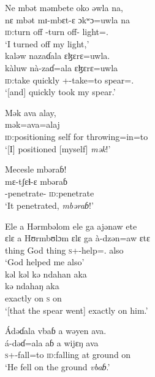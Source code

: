 \ea
 Ne  mbət  məmbete  oko  əwla  na,\\
\gll nɛ   mbət           mɪ-mbɛt-ɛ           ɔkʷɔ=uwla        na\\
{\oneS}    {\textsc{id}:turn off}  {\NOM}{}-{turn off}-{\CL}  light={\oneS}.{\POSS}  {\PSP} \\
\glt ‘I turned off my light,’\\

\medskip
 kaləw  nazaɗala  ɛɮɛrɛ=uwla.\\
\gll kàluw               nà-zaɗ=ala  ɛɮɛrɛ=uwla\\
{\textsc{id}:take quickly}  {\oneS}+{\PFV}-take=to spear={\oneS}.{\POSS} \\
\glt ‘[and] quickly took my spear.’
\z

\ea
 Mək  ava  alay,\\
\gll mək=ava=alaj\\
{\textsc{id}:positioning self for throwing}=in=to\\
\glt ‘[I] positioned [myself] \textit{mək}!’
\z

\ea
 Mecesle  mbəraɓ! \\
\gll mɛ-tʃɛɬ-ɛ            mbəraɓ\\
{\NOM}{}-penetrate-{\CL}      \textsc{id}:penetrate\\
\glt ‘It penetrated, \textit{mbəraɓ}!’
\z

\ea  
 {Ele  a}  Hərmbəlom  ele  ga  ajənaw  ete\\
\gll ɛlɛ     a        Hʊrmbʊlɔm  ɛlɛ     ga      à-dzən=aw    ɛtɛ\\
thing   {\GEN}   God    thing  {\ADJ}   \textsc{s}+{\PFV}-help={\oneS}.{\IO}    also \\
\glt ‘God helped me also’\\

\medskip
 kəl kəl   kə ndahan aka\\
   kə ndahaŋ aka\\
exactly  on  \textsc{s}        on\\
\glt ‘[that the spear went] exactly on him.’
\z

\ea 
 Ádəɗala vbaɓ  a  wəyen  ava.\\
\gll á-dəɗ=ala     \dentalflap aɓ         a     wijɛŋ      ava\\
\textsc{s}+{\IFV}-fall=to      \textsc{id}:falling    at    ground   on\\
\glt ‘He fell on the ground \textit{vbaɓ}.’
\z


